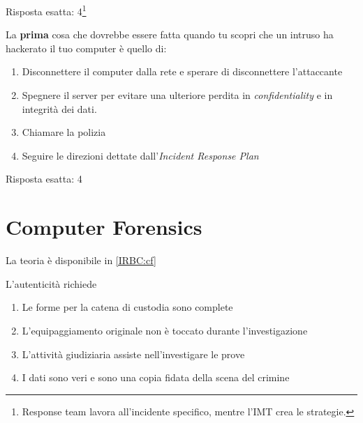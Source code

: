 \begin{Answer} [
  ref={esIRBC5},
  number={5}
  ]

  \Question Risposta esatta: 4\footnote{Response team lavora all'incidente
  specifico, mentre l'IMT crea le strategie.}
\end{Answer}


\begin{Exercise} [
  title={Quiz},
  label={esIRBC6}
  ]

  \Question La \textbf{prima} cosa che dovrebbe essere fatta quando tu scopri
che un intruso ha hackerato il tuo computer \`e quello di:
\begin{enumerate}
 \item Disconnettere il computer dalla rete e sperare di disconnettere
l'attaccante
 \item Spegnere il server per evitare una ulteriore perdita in
\textit{confidentiality} e in integrit\`a dei dati.
 \item Chiamare la polizia
 \item Seguire le direzioni dettate dall'\textit{Incident Response Plan}
\end{enumerate}
\end{Exercise}

\begin{Answer} [
  ref={esIRBC6},
  number={6}
  ]

  \Question Risposta esatta: 4
\end{Answer}

\section{Computer Forensics}
\label{esIRBC:cf}

La teoria \`e disponibile in \ref{IRBC:cf}



\begin{Exercise} [
  title={Quiz},
  label={esIRBC7}
  ]

  \Question L'autenticità richiede
  \begin{enumerate}
   \item Le forme per la catena di custodia sono complete
   \item L'equipaggiamento originale non \`e toccato durante l'investigazione
   \item L'attivit\`a giudiziaria assiste nell'investigare le prove
   \item I dati sono veri e sono una copia fidata della scena del crimine
  \end{enumerate}
\end{Exercise}

